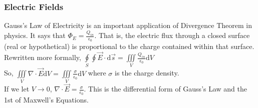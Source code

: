 \subsubsection{Electric Fields}
\noindent
Gauss's Law of Electricity is an important application of Divergence Theorem in physics. It says that $\Phi_{E}=\frac{Q_{in}}{\epsilon_{0}}$. That is, the electric flux through a closed surface (real or hypothetical) is proportional to the charge contained within that surface.\\
Rewritten more formally, $\oint\limits_{S}\oint{\vec{E}\cdot\mathrm{d}\vec{s}}=\iiint\limits_{V}{\frac{Q_{in}}{\epsilon_{0}}\mathrm{d}V}$\\
So, $\iiint\limits_{V}{\nabla\cdot\vec{E}\mathrm{d}V}=\iiint\limits_{V}{\frac{\sigma}{\epsilon_{0}}\mathrm{d}V}$ where $\sigma$ is the charge density.\\
If we let $V\to 0$, $\nabla\cdot\vec{E}=\frac{\sigma}{\epsilon_{0}}$. This is the differential form of Gauss's Law and the 1st of Maxwell's Equations.
